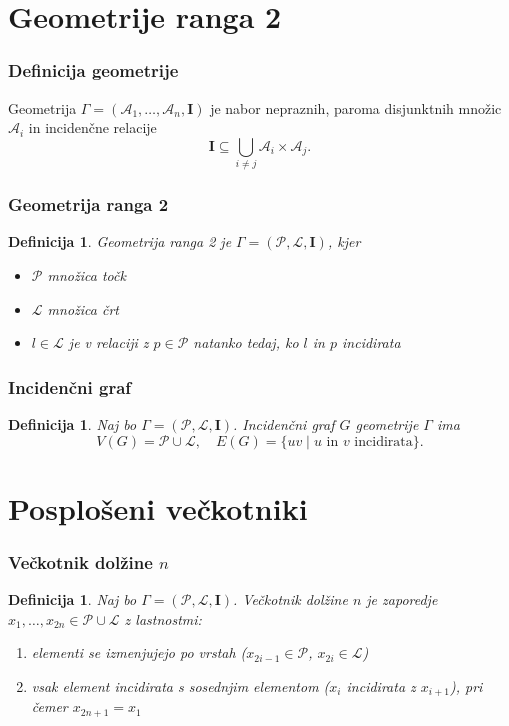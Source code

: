 \documentclass{beamer}
\newtheorem{definicija}[izrek]{Definicija}
\newcommand{\A}{\mathcal{A}}
\newcommand{\II}{\mathbf{I}}
\newcommand{\PP}{\mathcal{P}}
\newcommand{\LL}{\mathcal{L}}
\begin{document}
\section{Geometrije ranga 2}

\begin{frame}
\frametitle{Definicija geometrije}
Geometrija \(\Gamma=(\A_1, \dots, \A_n, \II)\) je nabor nepraznih, paroma disjunktnih množic \(\A_i\) in incidenčne relacije
\[
\II \subseteq \bigcup_{i\neq j} \A_i \times \A_j.
\]
\end{frame}

\begin{frame}
\frametitle{Geometrija ranga 2}
\begin{definicija}
Geometrija ranga 2 je \(\Gamma=(\PP, \LL, \II)\), kjer
\begin{itemize}
    \item \(\PP\) množica točk
    \item \(\LL\) množica črt
    \item $l \in \LL$ je v relaciji z $p \in \PP$ natanko tedaj, ko $l$ in $p$ incidirata
\end{itemize}
\end{definicija}
\end{frame}

\begin{frame}
\frametitle{Incidenčni graf}
\begin{definicija}
Naj bo \(\Gamma=(\PP,\LL,\II)\).  
Incidenčni graf \(G\) geometrije \(\Gamma\) ima
\[
V(G) = \PP \cup \LL, \quad E(G) = \{ uv \mid u \text{ in } v \text{ incidirata} \}.
\]
\end{definicija}
\end{frame}

\section{Posplošeni večkotniki}

\begin{frame}
\frametitle{Večkotnik dolžine $n$}
\begin{definicija}
Naj bo \(\Gamma=(\PP,\LL,\II)\). Večkotnik dolžine $n$ je zaporedje \(x_1, \dots, x_{2n} \in \PP \cup \LL\) z lastnostmi:
\begin{enumerate}[label=(\roman*)]
\item elementi se izmenjujejo po vrstah (\(x_{2i-1} \in \PP\), \(x_{2i} \in \LL\))
\item vsak element incidirata s sosednjim elementom (\(x_i\) incidirata z \(x_{i+1}\)), pri čemer \(x_{2n+1}=x_1\)
\end{enumerate}
\end{definicija}
\end{frame}
\end{document}
